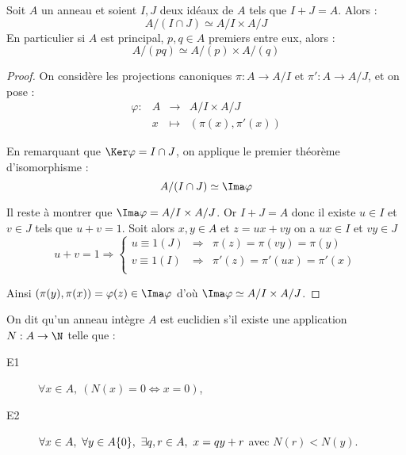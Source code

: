 \begin{lemm}
 
Soit $A$ un anneau et soient $I,J$ deux idéaux de $A$ tels que $I+J = A$. Alors
: \begin{displaymath}
   A/(I\cap J) \simeq A/I \times A/J
  \end{displaymath}
En particulier si $A$ est principal, $p,q \in A$ premiers entre eux, alors :
\begin{displaymath}
 A/(pq) \simeq A/(p) \times A/(q)
\end{displaymath}
\end{lemm}

\begin{proof} On considère les projections canoniques $\pi : A \rightarrow A/I$
et $\pi' : A \rightarrow A/J$, et on pose :
\begin{displaymath} \begin{array}{rrcl}
 \varphi : &A &\longrightarrow & A/I \times A/J \\
           &x &\longmapsto     & (\pi(x),\pi'(x))
\end{array} \end{displaymath}

En remarquant que $\Ker \varphi = I\cap J$, on applique le premier théorème
d'isomorphisme :
\begin{displaymath}
 A/(I\cap J) \simeq \Ima \varphi
\end{displaymath}

Il reste à montrer que $\Ima \varphi = A/I\times A/J$. Or $I+J = A$ donc il
existe $u\in I$ et $v\in J$ tels que $u+v = 1$.
Soit alors $x, y\in A$ et $z=ux+vy$ on a $ux\in I$ et $vy\in J$
\begin{displaymath}u+v=1 \Rightarrow 
\left\lbrace\begin{array}{rcl}
u \equiv 1 (J) &\Rightarrow& \pi(z) = \pi(vy) = \pi(y) \\
v \equiv 1 (I) &\Rightarrow& \pi'(z) = \pi'(ux) = \pi'(x)\\
\end{array}\right. \end{displaymath}

Ainsi $(\pi(y),\pi(x)) = \varphi(z) \in \Ima \varphi$ d'où $\Ima \varphi \simeq
 A/I\times A/J$.
\end{proof}

\begin{defi}
 
On dit qu'un anneau intègre $A$ est euclidien s'il existe une application $N :
A\rightarrow \N$ telle que :
\begin{description}
 \item [E1] $\forall x \in A,\ (N(x) = 0 \Leftrightarrow x=0)$,
 \item [E2] $\forall x \in A,\ \forall y \in A\-\{0\},\ \exists q,r\in A,\ x =
qy+r$ avec $N(r) < N(y)$.
\end{description}
\end{defi}


